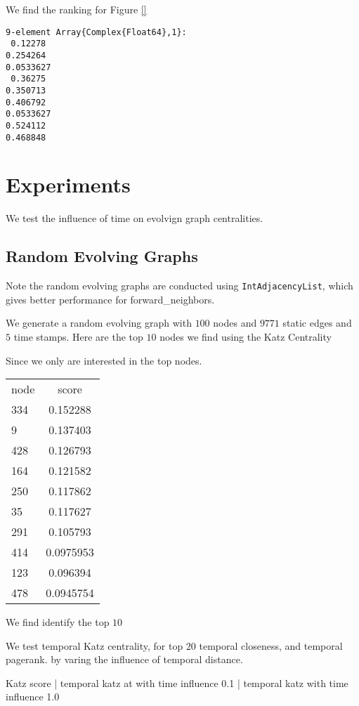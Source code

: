 \documentclass[12pt]{article}
\theoremstyle{definition}
\begin{document}
We find the ranking for Figure \ref{}

\begin{lstlisting}
9-element Array{Complex{Float64},1}:
 0.12278
0.254264
0.0533627
 0.36275
0.350713
0.406792
0.0533627
0.524112
0.468848
\end{lstlisting}

\section{Experiments}
\label{sec:experiments}

We test the influence of time on evolvign graph centralities.

\subsection{Random Evolving Graphs}
\label{sec:random}

Note the random evolving graphs are conducted using \texttt{IntAdjacencyList}, which gives better performance for
forward\_neighbors.

We generate a random evolving graph with $100$ nodes and $9771$ static edges and $5$ time stamps.
Here are the top $10$ nodes we find using the Katz Centrality

Since we only are interested in the top nodes.

\begin{tabular}{ l | c }
  \hline
  node & score \\
  334 & 0.152288 \\
  9 & 0.137403 \\
  428 & 0.126793 \\
  164 & 0.121582 \\
  250 & 0.117862 \\
  35 & 0.117627 \\
  291 & 0.105793 \\
  414 & 0.0975953 \\
  123 & 0.096394 \\
  478 & 0.0945754 \\
  \hline
\end{tabular}



We find identify the top $10$

We test temporal Katz centrality,  for top $20$
temporal closeness, and temporal pagerank.
by varing the influence of temporal distance.



Katz score | temporal katz at with time influence 0.1 | temporal katz with time influence 1.0
\end{document}

